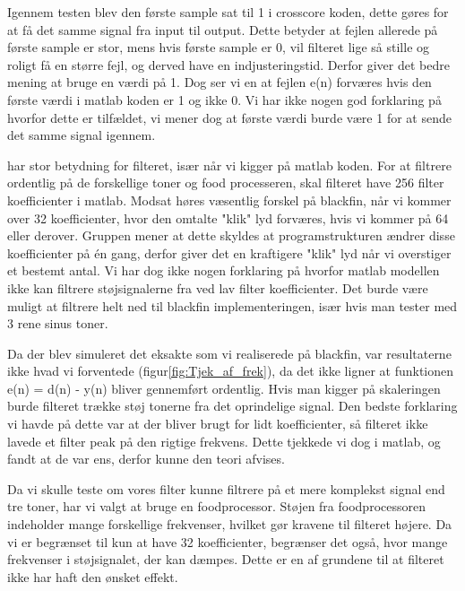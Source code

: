 \begin{description}[align=left]
\item [Første sample = 1.] Igennem testen blev den første sample sat til 1 i crosscore koden, dette gøres for at få det samme signal fra input til output. Dette betyder at fejlen allerede på første sample er stor, mens hvis første sample er 0, vil filteret lige så stille og roligt få en større fejl, og derved have en indjusteringstid. Derfor giver det bedre mening at bruge en værdi på 1. Dog ser vi en at fejlen e(n) forværes hvis den første værdi i matlab koden er 1 og ikke 0. Vi har ikke nogen god forklaring på hvorfor dette er tilfældet, vi mener dog at første værdi burde være 1 for at sende det samme signal igennem. 
\item [Filter koefficienter] har stor betydning for filteret, især når vi kigger på matlab koden. For at filtrere ordentlig på de forskellige toner og food processeren, skal filteret have 256 filter koefficienter i matlab. Modsat høres væsentlig forskel på blackfin, når vi kommer over 32 koefficienter, hvor den omtalte "klik" lyd forværes, hvis vi kommer på 64 eller derover. Gruppen mener at dette skyldes at programstrukturen ændrer disse koefficienter på én gang, derfor giver det en kraftigere "klik" lyd når vi overstiger et bestemt antal. Vi har dog ikke nogen forklaring på hvorfor matlab modellen ikke kan filtrere støjsignalerne fra ved lav filter koefficienter. Det burde være muligt at filtrere helt ned til blackfin implementeringen, især hvis man tester med 3 rene sinus toner.   
\item [Simulering af realiseringen.] 
Da der blev simuleret det eksakte som vi realiserede på blackfin, var resultaterne  ikke hvad vi forventede (figur\ref{fig:Tjek_af_frek}), da det ikke ligner at funktionen e(n) = d(n) - y(n) bliver gennemført ordentlig. Hvis man kigger på skaleringen burde filteret trække støj tonerne fra det oprindelige signal. Den bedste forklaring vi havde på dette var at der bliver brugt for lidt koefficienter, så filteret ikke lavede et filter peak på den rigtige frekvens. Dette tjekkede vi dog i matlab, og fandt at de var ens, derfor kunne den teori afvises. 
\item [Food processor realisering] Da vi skulle teste om vores filter kunne filtrere på et mere komplekst signal end tre toner, har vi valgt at bruge en foodprocessor. Støjen fra foodprocessoren indeholder mange forskellige frekvenser, hvilket gør kravene til filteret højere. Da vi er begrænset til kun at have 32 koefficienter, begrænser det også, hvor mange frekvenser i støjsignalet, der kan dæmpes. Dette er en af grundene til at filteret ikke har haft den ønsket effekt. 

\end{description}
